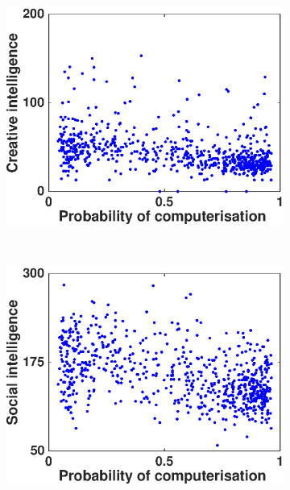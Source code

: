 \documentclass[11pt]{report}
\numberwithin{equation}{chapter}
\begin{document}
\begin{spacing}{2}
\begin{figure}[!htb]
\centering
\begin{subfigure}{0.55\textwidth}
\centering
	\includegraphics[scale = 0.5]{creative_intelligence.eps}
\end{subfigure} \\
\begin{subfigure}{0.55\textwidth}
\centering
	\includegraphics[scale = 0.5]{social_intelligence.eps}
\end{subfigure}\\


\end{figure}
\end{spacing}
\end{document}
